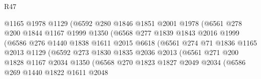 \begin{lexlean}{R47}
\begin{coremodule}
                            @1165
                            @1978
                            @1129
                            (@6592
                              @280
                              @1846
                              @1851
                              @2001
                              @1978
                              (@6561
                                @278
                                @200
                                @1844
                                @1167
                                @1999
                                @1350
                                (@6568
                                  @277
                                  @1839
                                  @1843
                                  @2016
                                  @1999
                                  (@6586
                                    @276
                                    @1440
                                    @1838
                                    @1611
                                    @2015
                                    @6618
                                    (@6561
                                      @274
                                      @71
                                      @1836
                                      @1165
                                      @2013
                                      @1129
                                      (@6592
                                        @273
                                        @1830
                                        @1835
                                        @2036
                                        @2013
                                        (@6561
                                          @271
                                          @200
                                          @1828
                                          @1167
                                          @2034
                                          @1350
                                          (@6568
                                            @270
                                            @1823
                                            @1827
                                            @2049
                                            @2034
                                            (@6586
                                              @269
                                              @1440
                                              @1822
                                              @1611
                                              @2048

\end{coremodule}
\end{lexlean}
